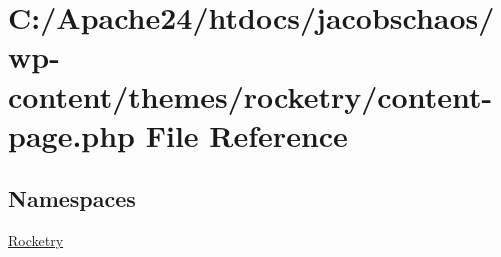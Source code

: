 \hypertarget{content-page_8php}{}\section{C\+:/\+Apache24/htdocs/jacobschaos/wp-\/content/themes/rocketry/content-\/page.php File Reference}
\label{content-page_8php}
\subsection*{Namespaces}
\begin{DoxyCompactItemize}
\item 
 \hyperlink{namespace_rocketry}{Rocketry}
\end{DoxyCompactItemize}
